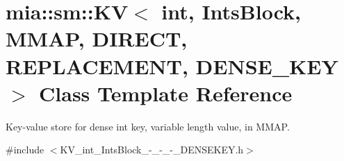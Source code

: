 \hypertarget{classmia_1_1sm_1_1_k_v_3_01int_00_01_ints_block_00_01_m_m_a_p_00_01_d_i_r_e_c_t_00_01_r_e_p_l_a_e377a0951ed37be3b4316b2929369f72}{\section{mia\-:\-:sm\-:\-:K\-V$<$ int, Ints\-Block, M\-M\-A\-P, D\-I\-R\-E\-C\-T, R\-E\-P\-L\-A\-C\-E\-M\-E\-N\-T, D\-E\-N\-S\-E\-\_\-\-K\-E\-Y $>$ Class Template Reference}
\label{classmia_1_1sm_1_1_k_v_3_01int_00_01_ints_block_00_01_m_m_a_p_00_01_d_i_r_e_c_t_00_01_r_e_p_l_a_e377a0951ed37be3b4316b2929369f72}
}


Key-\/value store for dense int key, variable length value, in M\-M\-A\-P.  




{\ttfamily \#include $<$K\-V\-\_\-int\-\_\-\-Ints\-Block\-\_\--\/\-\_\--\/\-\_\--\/\-\_\-\-D\-E\-N\-S\-E\-K\-E\-Y.\-h$>$}

